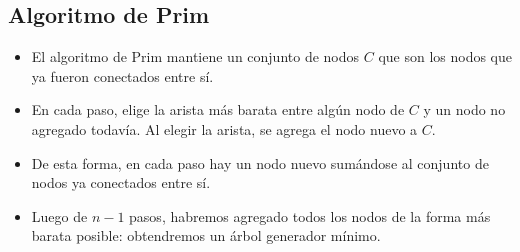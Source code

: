 \documentclass[compress]{beamer}
\begin{document}
\subsection{Algoritmo de Prim}
\begin{frame}

\begin{itemize}
\item El algoritmo de Prim mantiene un conjunto de nodos $C$ que son los nodos que
ya fueron conectados entre sí. 
\item En cada paso, elige la arista más barata entre algún nodo de $C$ y un 
nodo no agregado todavía. Al elegir la arista, se agrega el nodo nuevo a $C$. 
\item De esta forma, en cada paso hay un nodo nuevo sumándose al 
conjunto de nodos ya conectados entre sí. 
\item Luego de $n-1$ pasos, habremos agregado todos los nodos de la forma más
barata posible: obtendremos un árbol generador mínimo.
\end{itemize}

\end{frame}
\end{document}
